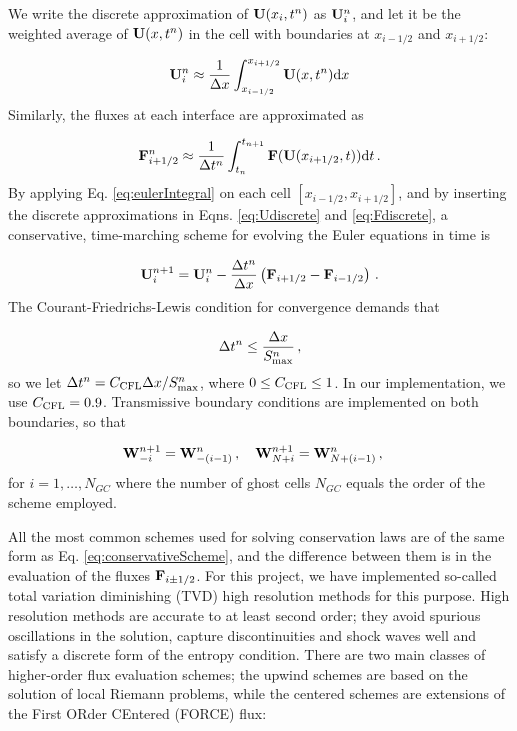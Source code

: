 \documentclass[final,3p,twocolumn]{elsarticle}
\begin{document}
We write the discrete
approximation of ${\bf U}(x_i, t^n)$ as ${\bf U}_i^n$, and let it be the
weighted average of ${\bf U}(x,t^n)$ in the cell with boundaries at
$x_{i-1/2}$ and $x_{i+1/2}$: 

\begin{equation}
    {\bf U}_i^n \approx \frac{1}{\Delta x} \int_{x_{i-1/2}}^{x_{i+1/2}} {\bf
    U}(x,t^n) {\rm d}x 
    \label{eq:Udiscrete}
\end{equation}
%
Similarly, the fluxes at each interface are approximated as 

\begin{equation}
    {\bf F}_{i+1/2}^n \approx \frac{1}{\Delta t^n} 
    \int_{t_{n}}^{t_{n+1}} {\bf F}({\bf U}(x_{i+1/2},t)) {\rm d}t \,. 
    \label{eq:Fdiscrete}
\end{equation}
%
By applying Eq. \eqref{eq:eulerIntegral} on each cell $[x_{i-1/2},x_{i+1/2}]$,
and by inserting the discrete approximations in Eqns. \eqref{eq:Udiscrete} and
\eqref{eq:Fdiscrete}, a conservative, time-marching scheme for evolving the
Euler equations in time is 

\begin{equation}
    {\bf U}_i^{n+1} = {\bf U}_i^n - \frac{\Delta t^n}{\Delta x} \left(
    {\bf F}_{i+1/2} - {\bf F}_{i-1/2} \right) \,. 
    \label{eq:conservativeScheme}
\end{equation}
%
The Courant-Friedrichs-Lewis condition for convergence demands that 

\begin{equation}
    \Delta t^n \leq \frac{\Delta x}{S_{\rm max}^n} \,,
\end{equation}
%
so we let $\Delta t^n = C_{\rm CFL} \Delta x / S_{\rm max}^n$, where $0 \leq
C_{\rm CFL} \leq 1$. In our implementation, we use $C_{\rm CFL}=0.9$.
Transmissive boundary conditions are implemented on both boundaries, so that

\begin{equation}
    \label{eq:BCs} 
    {\bf W}_{-i}^{n+1} = {\bf W}_{-(i-1)}^{n} \,, \quad
    {\bf W}_{N+i}^{n+1} = {\bf W}_{N+(i-1)}^{n} \,, \quad 
\end{equation}
%
for $i=1, \dots, N_{GC}$ where the number of ghost cells $N_{GC}$ equals the
order of the scheme employed. 

All the most common schemes used for solving conservation laws are of the same
form as Eq. \eqref{eq:conservativeScheme}, and the difference between them is
in the evaluation of the fluxes ${\bf F}_{i\pm 1/2}$. For this project, we have
implemented so-called total variation diminishing (TVD) high resolution methods
for this purpose. High resolution methods are accurate to at least second
order; they avoid spurious oscillations in the solution, capture
discontinuities and shock waves well and satisfy a discrete form of the entropy
condition. There are two main classes of higher-order flux evaluation schemes;
the upwind schemes are based on the solution of local Riemann problems, while
the centered schemes are extensions of the First ORder CEntered (FORCE) flux: 
\end{document}
